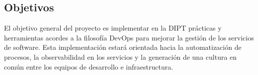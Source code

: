 \subsection{Objetivos}

El objetivo general del proyecto es implementar en la DIPT prácticas y
herramientas acordes a la filosofía DevOps para mejorar la gestión de
los servicios de software. Esta implementación estará orientada hacia
la automatización de procesos, la observabilidad en los servicios y la
generación de una cultura en común entre los equipos de desarrollo e
infraestructura.
